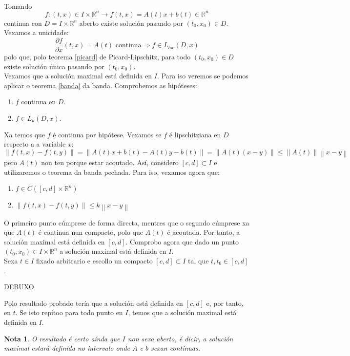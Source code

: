 \documentclass[11pt, a4paper,twoside]{article}
\makeatletter
\theoremstyle{theorem-style}  %
\renewenvironment{proof}[1][\proofname]{\par
	\pushQED{\qed}%
	\normalfont \topsep6\p@\@plus6\p@\relax
	\list{}{%
		\settowidth{\leftmargin}{\quad:\hskip\labelsep}%
		\setlength{\labelwidth}{0pt}%
		\setlength{\itemindent}{-\leftmargin}%
	}%
	\item[\hskip\labelsep\itshape#1\@addpunct{:}]\ignorespaces
}{%
	\popQED\endlist\@endpefalse
}
\theoremstyle{definition-style}
\newtheorem*{note}{Nota} %
\theoremstyle{example-style}
\providecommand{\norm}[1]{\left\lVert#1\right\rVert} %
\makeatother
\begin{document}
\begin{proof}\ \\
	Tomando
	\[f:(t, x) \in I \times \mathbb{R}^n \longrightarrow f(t,x)=A(t)x+b(t)\in\mathbb{R}^n\]
	continua con $D = I \times \mathbb{R}^n$ aberto existe solución pasando por $(t_0, x_0) \in D$. Vexamos a unicidade:
	\[\frac{\partial f}{\partial x} (t, x) = A(t) \text{ continua} \Rightarrow f \in L_{loc} (D, x)\]
	polo que, polo teorema \ref{picard} de Picard-Lipschitz, para todo $ (t_0, x_0) \in D$ existe solución única pasando por $(t_0, x_0)$. \\
	Vexamos que a solución maximal está definida en $I$. Para iso veremos se podemos aplicar o teorema \ref{banda} da banda. Comprobemos as hipóteses:
	\begin{enumerate}
		\item $f$ continua en $D$.
		\item $f \in L_k (D, x)$.
	\end{enumerate}
	Xa temos que $f$ é continua por hipótese. Vexamos se $f$ é lipschitziana en $D$ respecto a a variable $x$:
	\[\norm{f(t, x) - f(t, y)} = \norm{A(t)x + b(t) - A(t)y - b(t)} = \norm{A(t) (x-y)} \leq \norm{A(t)} \norm{x - y} \]
	pero $A(t)$ non ten porque estar acoutado. Así, considero $[c, d] \subset I$ e utilizaremos o teorema da banda pechada. Para iso, vexamos agora que:
	\begin{enumerate}
		\item $f \in C([c, d] \times \mathbb{R}^n)$
		\item $\norm{f(t, x) - f(t, y)} \leq k \norm{x - y}$
	\end{enumerate}
	O primeiro punto cúmprese de forma directa, mentres que o segundo cúmprese xa que $A(t)$ é continua nun compacto, polo que $A(t)$ é acoutada. Por tanto, a solución maximal está definida en $[c, d]$. Comprobo agora que dado un punto $(t_0, x_0) \in I \times \mathbb{R}^n$ a solución maximal está definida en $I$. \\
	Sexa $t \in I$ fixado arbitrario e escollo un compacto $[c, d]\subset I$ tal que $t, t_0 \in [c, d]$. \\
	\begin{center}
		DEBUXO
	\end{center}
	Polo resultado probado tería que a solución está definida en $[c, d]$ e, por tanto, en $t$. Se isto repítoo para todo punto en $I$, temos que a solución maximal está definida en $I$.
\end{proof}
\begin{note}
	O resultado é certo aínda que $I$ non sexa aberto, é dicir, a solución maximal estará definida no intervalo onde $A$ e $b$ sexan continuas.
\end{note}
\end{document}
